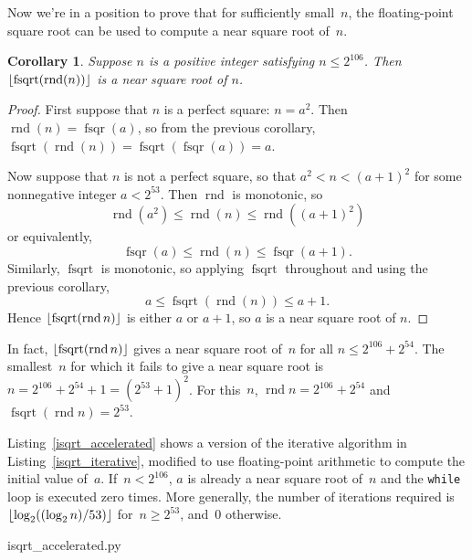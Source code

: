 \documentclass[a4paper]{article}
\DeclarePairedDelimiter\floor{\lfloor}{\rfloor}
\DeclareMathOperator{\rnd}{rnd}
\DeclareMathOperator{\fsqrt}{fsqrt}
\DeclareMathOperator{\fsqr}{fsqr}
\theoremstyle{plain}
\newtheorem{corollary}[theorem]{Corollary}
\theoremstyle{definition}
\begin{document}
Now we're in a position to prove that for sufficiently small~$n$, the
floating-point square root can be used to compute a near square root of~$n$.

\begin{corollary}
  Suppose $n$ is a positive integer satisfying $n \le 2^{106}$. Then
  $\floor{\fsqrt(\rnd(n))}$ is a near square root of $n$.
\end{corollary}

\begin{proof}
  First suppose that $n$ is a perfect square: $n = a^2$. Then $\rnd(n) =
  \fsqr(a)$, so from the previous corollary, $\fsqrt(\rnd(n)) =
  \fsqrt(\fsqr(a)) = a$.

  Now suppose that $n$ is not a perfect square, so that $a^2 < n < (a+1)^2$
  for some nonnegative integer $a < 2^{53}$. Then $\rnd$ is monotonic, so
    $$\rnd(a^2) \le \rnd(n) \le \rnd((a+1)^2)$$
  or equivalently,
    $$\fsqr(a) \le \rnd(n) \le \fsqr(a+1).$$
  Similarly, $\fsqrt$ is monotonic, so applying $\fsqrt$ throughout
  and using the previous corollary,
    $$a \le \fsqrt(\rnd(n)) \le a + 1.$$
  Hence $\floor{\fsqrt(\rnd n)}$ is either $a$ or $a+1$, so $a$ is a near
  square root of $n$.
\end{proof}

In fact, $\floor{\fsqrt(\rnd n)}$ gives a near square root of~$n$ for all $n
\le 2^{106} + 2^{54}$. The smallest~$n$ for which it fails to give a near
square root is $n = 2^{106} + 2^{54} + 1 = (2^{53} + 1)^2$. For this~$n$, $\rnd
n = 2^{106} + 2^{54}$ and $\fsqrt(\rnd n) = 2^{53}$.

Listing~\ref{isqrt_accelerated} shows a version of the iterative
algorithm in Listing~\ref{isqrt_iterative}, modified to use floating-point
arithmetic to compute the initial value of~$a$.  If~$n < 2^{106}$,
$a$ is already a near square root of~$n$ and the \lstinline$while$ loop is
executed zero times. More generally, the number of iterations required
is~$\floor{\log_2((\log_2n)/53)}$ for~$n \ge 2^{53}$, and~$0$ otherwise.


  {isqrt_accelerated.py}


\end{document}

